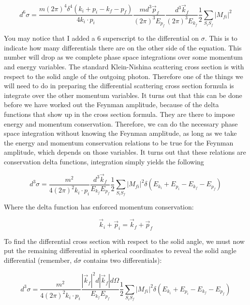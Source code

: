 \documentclass[a4]{article}
\begin{document}
    \begin{equation}
        d^6 \sigma = \frac{m (2 \pi)^4 \delta^4 (k_i + p_i - k_f - p_f)}{4 k_i \cdot p_i} \frac{m d^3 \vec{p}_f}{(2 \pi)^3 E_{p_f}} \frac{d^3 \vec{k}_f}{(2 \pi)^3 E_{k_f}} \frac{1}{2} \sum_{S_i S_f} |M_{fi}|^2
    \end{equation}

    You may notice that I added a 6 superscript to the differential on $\sigma$. This is to indicate how many differentials there are on the other
    side of the equation. This number will drop as we complete phase space integrations over some momentum and energy
    variables.
    The standard Klein-Nishina scattering cross section is with respect to the solid angle of the outgoing photon. Therefore one of the
    things we will need to do in preparing the differential scattering cross section formula is integrate over the other momentum
    variables. It turns out that this can be done before we have worked out the Feynman amplitude, because of the delta functions that
    show up in the cross section formula. They are there to impose energy and momentum conservation. Therefore, we can do the 
    necessary phase space integration without knowing the Feynman amplitude, as long as we take the energy and momentum
    conservation relations to be true for the Feynman amplitude, which depends on those variables. It turns out that these relations are
    conservation delta functions, integration simply yields the following

    \begin{equation}
        d^3 \sigma = \frac{m^2}{4(2 \pi)^2 k_i \cdot p_i} \frac{d^3 \vec{k}_f}{E_{k_f} E_{p_f}} \frac{1}{2} \sum_{S_i S_f} |M_{fi}|^2 \delta (E_{k_i} + E_{p_i} - E_{k_f} - E_{p_f})
    \end{equation}

    Where the delta function has enforced momentum conservation:

    \begin{equation}
        \vec{k}_{i} + \vec{p}_{i} = \vec{k}_{f} + \vec{p}_{f}
    \end{equation}

    To find the differential cross section with respect to the solid angle, we must now put the remaining differential in spherical coordinates to
    reveal the solid angle differential (remember, $d\sigma$ contains two differentials):

    \begin{equation}
        d^3 \sigma = \frac{m^2}{4 (2 \pi)^2 k_i \cdot p_i} \frac{|\vec{k}_f|^2 d|\vec{k}_f| d \Omega}{E_{k_f} E_{p_f}} \frac{1}{2} \sum_{S_i S_f} |M_{fi}|^2 \delta (E_{k_i} + E_{p_i} - E_{k_f} - E_{p_f})
    \end{equation}
\end{document}
